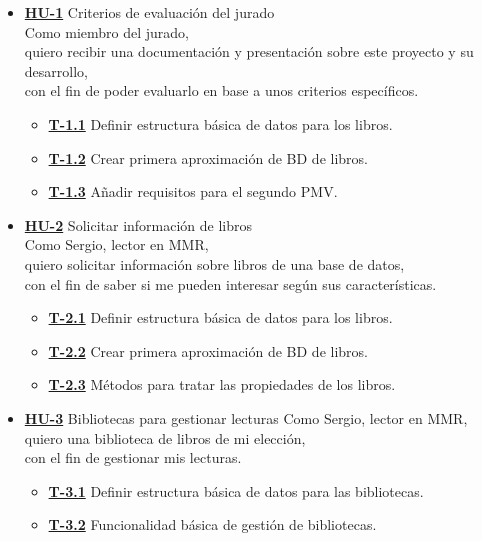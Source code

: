 \begin{itemize}
    \item \href{https://github.com/Anglepi/My-Many-Reads/issues/7}{\textbf{HU-1}} Criterios de evaluación del jurado \\
    Como miembro del jurado, \\
    quiero recibir una documentación y presentación sobre este proyecto y su desarrollo, \\
    con el fin de poder evaluarlo en base a unos criterios específicos.
    \begin{itemize}
        \item \href{https://github.com/Anglepi/My-Many-Reads/issues/15}{\textbf{T-1.1}} Definir estructura básica de datos para los libros.
        \item \href{https://github.com/Anglepi/My-Many-Reads/issues/36}{\textbf{T-1.2}} Crear primera aproximación de BD de libros.
        \item \href{https://github.com/Anglepi/My-Many-Reads/issues/37}{\textbf{T-1.3}} Añadir requisitos para el segundo PMV.
    \end{itemize}
    \item \href{https://github.com/Anglepi/My-Many-Reads/issues/29}{\textbf{HU-2}} Solicitar información de libros \\
    Como Sergio, lector en MMR, \\
    quiero solicitar información sobre libros de una base de datos, \\
    con el fin de saber si me pueden interesar según sus características.
    \begin{itemize}
        \item \href{https://github.com/Anglepi/My-Many-Reads/issues/31}{\textbf{T-2.1}} Definir estructura básica de datos para los libros.
        \item \href{https://github.com/Anglepi/My-Many-Reads/issues/32}{\textbf{T-2.2}} Crear primera aproximación de BD de libros.
        \item \href{https://github.com/Anglepi/My-Many-Reads/issues/33}{\textbf{T-2.3}} Métodos para tratar las propiedades de los libros.
    \end{itemize}
    \item \href{https://github.com/Anglepi/My-Many-Reads/issues/30}{\textbf{HU-3}} Bibliotecas para gestionar lecturas
    Como Sergio, lector en MMR, \\
    quiero una biblioteca de libros de mi elección, \\
    con el fin de gestionar mis lecturas.
    \begin{itemize}
        \item \href{https://github.com/Anglepi/My-Many-Reads/issues/34}{\textbf{T-3.1}} Definir estructura básica de datos para las bibliotecas.
        \item \href{https://github.com/Anglepi/My-Many-Reads/issues/35}{\textbf{T-3.2}} Funcionalidad básica de gestión de bibliotecas.
    \end{itemize}
\end{itemize}